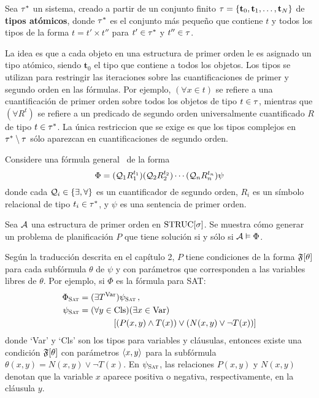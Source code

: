 Sea $\tau^*$ un sistema, creado a partir de un conjunto finito 
$\tau=\{\mathbf{t}_0,\mathbf{t}_1,\ldots,\mathbf{t}_N\}$
de \textbf{tipos atómicos}, donde $\tau^*$ es el conjunto más pequeño que
contiene $t$ y todos los tipos de la forma $t=t'\times t''$
para $t'\in\tau^*$ y $t''\in\tau$.

La idea es que a cada objeto en una estructura de primer orden le es asignado
un tipo atómico, siendo $\mathbf{t}_0$ el tipo que contiene a todos los
objetos.
Los tipos se utilizan para restringir las iteraciones sobre las
cuantificaciones de primer y segundo orden en las fórmulas.
Por ejemplo, $(\forall x\in t)$ se refiere a una cuantificación de primer orden
sobre todos los objetos de tipo $t\in\tau$, mientras que
$(\forall R^t)$ se refiere a un predicado de segundo orden universalmente
cuantificado $R$ de tipo $t\in\tau^*$.
La única restriccion que se exige es que los tipos complejos en 
$\tau^*\setminus\tau$ sólo aparezcan en cuantificaciones de segundo orden.

Considere una fórmula general \LSO\ de la forma
\begin{equation}
\Phi = (\mathcal{Q}_1R_1^{t_1})(\mathcal{Q}_2R_2^{t_2})\cdots(\mathcal{Q}_nR_n^{t_n})\psi
\end{equation}
donde cada $\mathcal{Q}_i\in\{\exists,\forall\}$ es un cuantificador de segundo orden,
$R_i$ es un símbolo relacional de tipo $t_i\in\tau^*$,
y $\psi$ es una sentencia de primer orden.

Sea $\mathcal{A}$ una estructura de primer orden en $\text{STRUC}[\sigma]$.
Se muestra cómo generar un problema de planificación $P$ que tiene solución si
y sólo si $\mathcal{A}\vDash\Phi$.

Según la traducción descrita en el capítulo 2, 
$P$ tiene condiciones de la forma $\mathfrak{F}[\theta]$
para cada subfórmula $\theta$ de $\psi$ y con parámetros que corresponden a las
variables libres de $\theta$. Por ejemplo, si $\Phi$ es la fórmula para SAT:
\begin{alignat*}{1}
\Phi_{\textsc{Sat}} &= (\exists T^\text{Var})\psi_{\textsc{Sat}} \,, \\
\psi_{\textsc{Sat}} &= (\forall y\in \text{Cls})(\exists x\in\text{Var}) \notag \\
          &\quad\quad\quad\quad
               [(P(x,y) \land T(x)) \lor (N(x,y) \lor \neg T(x))]
\end{alignat*}
donde `Var' y `Cls' son los tipos para variables y cláusulas,
entonces existe una condición $\mathfrak{F}[\theta]$ con parámetros
$\langle x,y \rangle$ para la subfórmula $\theta(x,y)=N(x,y)\lor\neg T(x)$.
En $\psi_{\textsc{Sat}}$, las relaciones $P(x,y)$ y $N(x,y)$ denotan
que la variable $x$ aparece positiva o negativa, respectivamente, en la
cláusula $y$.

